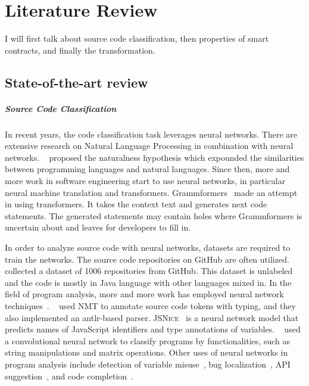 \chapter{Literature Review}


I will first talk about source code classification, then properties of smart contracts, and finally the transformation.

\section{State-of-the-art review}

\paragraph*{Source Code Classification}
In recent years, the code classification task leverages neural networks.
There are extensive research on Natural Language Processing in combination with neural networks. ~\cite{allamanis2018survey} proposed the naturalness hypothesis which expounded the similarities between programming languages and natural languages. Since then, more and more work in software engineering start to use neural networks, in particular neural machine translation and transformers.
Grammformers~\cite{guo2021learning} made an attempt in using transformers. It takes the context text and generates next code statements. The generated statements may contain holes where Grammformers is uncertain about and leaves for developers to fill in.

In order to analyze source code with neural networks, datasets are required to train the networks. The source code repositories on GitHub are often utilized.
~\cite{jiang2017} collected a dataset of \num{1006} repositories from GitHub. This dataset is unlabeled and the code is mostly in Java language with other languages mixed in.
In the field of program analysis, more and more work has employed neural network techniques~\cite{morgachev2019detection,huo2016learning,gu2016deep}.
~\cite{alexandru2017replicating} used NMT to annotate source code tokens with typing,
and they also implemented an {\sc antlr}-based parser.
\textsc{JSNice}~\cite{raychev2015predicting} is a neural network model that predicts names of JavaScript identifiers and type annotations of variables.
~\cite{mou2016convolutional} used a convolutional neural network to classify programs by functionalities, such as string manipulations and matrix operations.
Other uses of neural networks in program analysis include
detection of variable misuse~\cite{morgachev2019detection},
bug localization~\cite{huo2016learning},
API suggestion~\cite{gu2016deep}, and
code completion~\cite{raychev2014code}.


